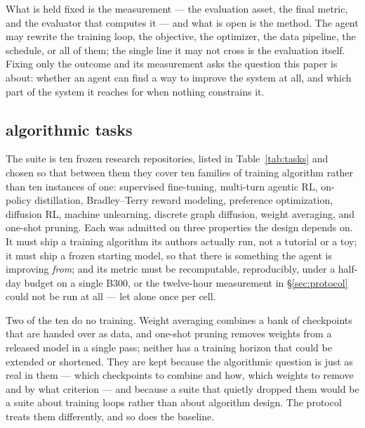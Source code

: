 What is held fixed is the measurement --- the evaluation asset, the final metric, and the evaluator
that computes it --- and what is open is the method. The agent may rewrite the training loop, the
objective, the optimizer, the data pipeline, the schedule, or all of them; the single line it may not
cross is the evaluation itself. Fixing only the outcome and its measurement asks the question this
paper is about: whether an agent can find a way to improve the system at all, and which part of the
system it reaches for when nothing constrains it.


\subsection{\ai{} algorithmic tasks}
\label{sec:tasks}



The suite is ten frozen research repositories, listed in Table~\ref{tab:tasks} and chosen so that
between them they cover ten families of
training algorithm rather than ten instances of one: supervised fine-tuning, multi-turn agentic RL,
on-policy distillation, Bradley--Terry reward modeling, preference optimization, diffusion RL,
machine unlearning, discrete graph diffusion, weight averaging, and one-shot pruning. Each was
admitted on three properties the design depends on. It must ship a training algorithm its authors
actually run, not a tutorial or a toy; it must ship a frozen starting model, so that there is
something the agent is improving \emph{from}; and its metric must be recomputable, reproducibly, under
a half-day budget on a single B300, or the twelve-hour measurement in \S\ref{sec:protocol} could not
be run at all --- let alone once per cell.

Two of the ten do no training. Weight averaging combines a bank of checkpoints that are handed over
as data, and one-shot pruning removes weights from a released model in a single pass; neither has a
training horizon that could be extended or shortened. They are kept because the algorithmic question
is just as real in them --- which checkpoints to combine and how, which weights to remove and by what
criterion --- and because a suite that quietly dropped them would be a suite about training loops
rather than about algorithm design. The protocol treats them differently, and so does the baseline.

